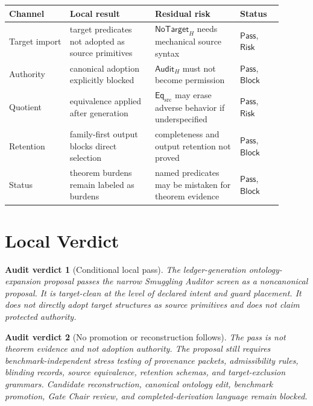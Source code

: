 \documentclass[11pt]{article}
\newcommand{\EqSrc}{\mathsf{Eq}_{\mathrm{src}}}
\newcommand{\NoTargetH}{\mathsf{NoTarget}_{H}}
\newcommand{\AuditH}{\mathsf{Audit}_{H}}
\newcommand{\Pass}{\mathsf{Pass}}
\newcommand{\Block}{\mathsf{Block}}
\newcommand{\Risk}{\mathsf{Risk}}
\newtheorem{auditverdict}{Audit verdict}
\begin{document}
\begin{center}
\begin{tabular}{p{0.2\linewidth}p{0.28\linewidth}p{0.28\linewidth}p{0.14\linewidth}}
\textbf{Channel} & \textbf{Local result} & \textbf{Residual risk} & \textbf{Status} \\
\hline
Target import & target predicates not adopted as source primitives & \(\NoTargetH\) needs mechanical source syntax & \(\Pass\), \(\Risk\) \\
Authority & canonical adoption explicitly blocked & \(\AuditH\) must not become permission & \(\Pass\), \(\Block\) \\
Quotient & equivalence applied after generation & \(\EqSrc\) may erase adverse behavior if underspecified & \(\Pass\), \(\Risk\) \\
Retention & family-first output blocks direct selection & completeness and output retention not proved & \(\Pass\), \(\Block\) \\
Status & theorem burdens remain labeled as burdens & named predicates may be mistaken for theorem evidence & \(\Pass\), \(\Block\) \\
\end{tabular}
\end{center}

\section{Local Verdict}

\begin{auditverdict}[Conditional local pass]
The ledger-generation ontology-expansion proposal passes the narrow
Smuggling Auditor screen as a noncanonical proposal. It is target-clean at
the level of declared intent and guard placement. It does not directly
adopt target structures as source primitives and does not claim protected
authority.
\end{auditverdict}

\begin{auditverdict}[No promotion or reconstruction follows]
The pass is not theorem evidence and not adoption authority. The proposal
still requires benchmark-independent stress testing of provenance packets,
admissibility rules, blinding records, source equivalence, retention
schemas, and target-exclusion grammars. Candidate reconstruction, canonical
ontology edit, benchmark promotion, Gate Chair review, and
completed-derivation language remain blocked.
\end{auditverdict}
\end{document}
